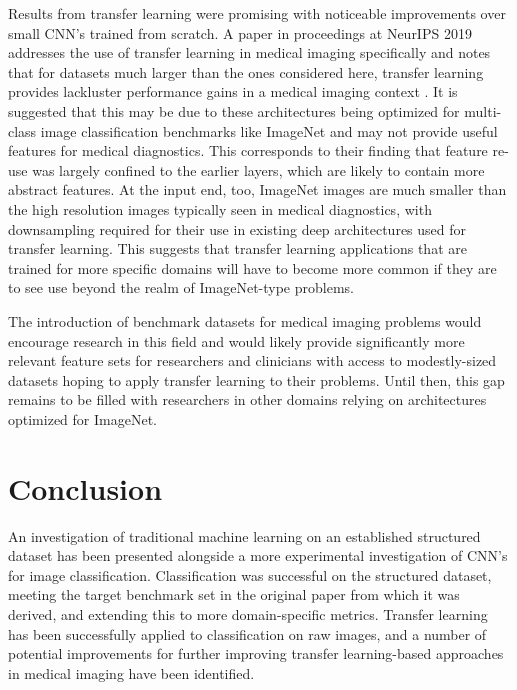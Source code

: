 \documentclass{article}
\begin{document}
	Results from transfer learning were promising with noticeable improvements over small CNN's trained from scratch. A paper in proceedings at NeurIPS 2019 addresses the use of transfer learning in medical imaging specifically and notes that for datasets much larger than the ones considered here, transfer learning provides lackluster performance gains in a medical imaging context \cite{raghu2019transfusion}. It is suggested that this may be due to these architectures being optimized for multi-class image classification benchmarks like ImageNet and may not provide useful features for medical diagnostics. This corresponds to their finding that feature re-use was largely confined to the earlier layers, which are likely to contain more abstract features. At the input end, too, ImageNet images are much smaller than the high resolution images typically seen in medical diagnostics, with downsampling required for their use in existing deep architectures used for transfer learning. This suggests that transfer learning applications that are trained for more specific domains will have to become more common if they are to see use beyond the realm of ImageNet-type problems. 
	
	The introduction of benchmark datasets for medical imaging problems would encourage research in this field and would likely provide significantly more relevant feature sets for researchers and clinicians with access to modestly-sized datasets hoping to apply transfer learning to their problems. Until then, this gap remains to be filled with researchers in other domains relying on architectures optimized for ImageNet.	
	
	\section{Conclusion}
	An investigation of traditional machine learning on an established structured dataset has been presented alongside a more experimental investigation of CNN's for image classification. Classification was successful on the structured dataset, meeting the target benchmark set in the original paper from which it was derived, and extending this to more domain-specific metrics. Transfer learning has been successfully applied to classification on raw images, and a number of potential improvements for further improving transfer learning-based approaches in medical imaging have been identified.
	
	
	
\end{document}
